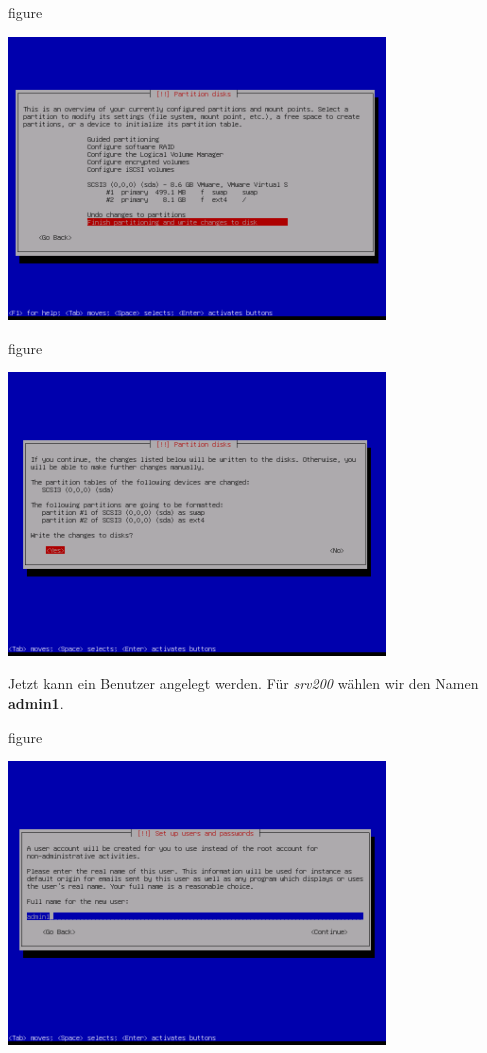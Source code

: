 \begin{nofloat}{figure}
\begin{center}
\includegraphics[width=0.75\textwidth]{screenshots/25_ubuntu_install.png}
\end{center}
\end{nofloat}

\begin{nofloat}{figure}
\begin{center}
\includegraphics[width=0.75\textwidth]{screenshots/26_ubuntu_install.png}
\end{center}
\end{nofloat}
\newpage
Jetzt kann ein Benutzer angelegt werden. Für \textit{srv200} wählen wir den
Namen \textbf{admin1}.

\begin{nofloat}{figure}
\begin{center}
\includegraphics[width=0.75\textwidth]{screenshots/27_ubuntu_install.png}
\end{center}
\end{nofloat}

